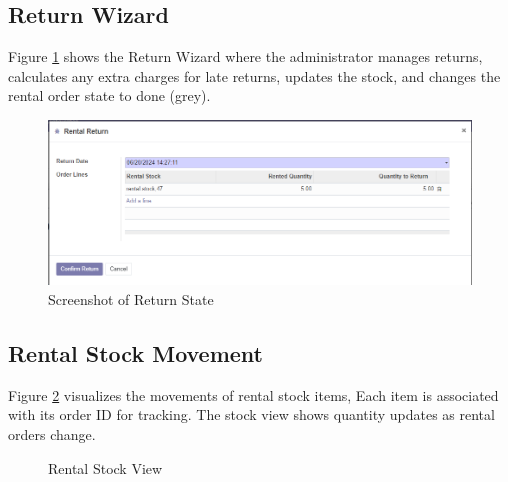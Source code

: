 \subsection{Return Wizard}
Figure \ref{fig:return_state} shows the Return Wizard where the administrator manages returns, calculates any extra charges for late returns, updates the stock, and changes the rental order state to done (grey).

\begin{figure}[h]
    \centering
    \includegraphics[width=1\textwidth]{sprint2/rentalorderreturn4.png}
    \caption{Screenshot of Return State}
    \label{fig:return_state}
\end{figure}

\subsection{Rental Stock Movement}
Figure \ref{fig:rental_stock_view} visualizes the movements of rental stock items, Each item is associated with its order ID for tracking. The stock view shows quantity updates as rental orders change.
\begin{figure}[h]
    \centering
    \caption{Rental Stock View}
    \label{fig:rental_stock_view}
\end{figure}

